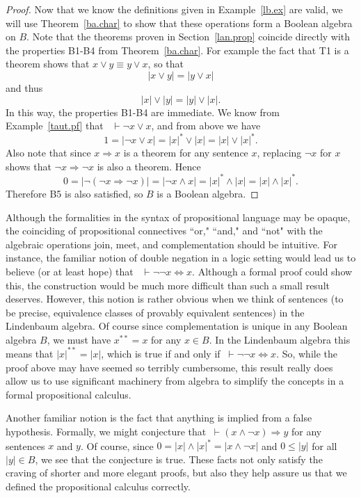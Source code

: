 \documentclass[11pt,titlepage]{article}
\newcommand{\imp}{\Rightarrow}
\newcommand{\ifff}{\Leftrightarrow}
\theoremstyle{definition}
\begin{document}
\begin{proof}
Now that we know the definitions given in Example~\ref{lb.ex} are valid, we will use Theorem~\ref{ba.char} to show that these operations form a Boolean algebra on $B$. Note that the theorems proven in Section~\ref{lan.prop} coincide directly with the properties B1-B4 from Theorem~\ref{ba.char}. For example the fact that T1 is a theorem shows that $x\lor y\equiv y\lor x$, so that $$|x\lor y| = |y\lor x|$$ and thus $$|x|\lor |y| = |y| \lor |x|.$$ In this way, the properties B1-B4 are immediate. We know from Example~\ref{taut.pf} that \ $\vdash \neg x \lor x$, and from above we have $$1=|\neg x \lor x| = |x|^*\lor |x| =|x|\lor |x|^*  .$$ Also note that since $x \imp x$ is a theorem for any sentence $x$, replacing $\neg x$ for $x$ shows that $ \neg x \imp \neg x$ is also a theorem. Hence $$0=|\neg(\neg  x\imp \neg x)|= |\neg x \land  x|  = | x|^* \land | x|=|x|\land| x|^* .$$ Therefore B5 is also satisfied, so $B$ is a Boolean algebra.\end{proof}

Although the formalities in the syntax of propositional language may be opaque, the coinciding of propositional connectives ``or," ``and," and ``not" with the algebraic operations join, meet, and complementation should be intuitive. For instance, the familiar notion of double negation in a logic setting would lead us to believe (or at least hope) that \ $\vdash \neg\neg x \ifff x$. Although a formal proof could show this, the construction would be much more difficult than such a small result deserves. However, this notion is rather obvious when we think of sentences (to be precise, equivalence classes of provably equivalent sentences) in the Lindenbaum algebra. Of course since complementation is unique in any Boolean algebra $B$, we must have $x^{**}=x$ for any $x\in B$. In the Lindenbaum algebra this means that $|x|^{**}=|x|$, which is true if and only if $\ \vdash \neg \neg x \ifff x$. So, while the proof above may have seemed so terribly cumbersome, this result really does allow us to use significant machinery from algebra to simplify the concepts in a formal propositional calculus.

Another familiar notion is the fact that anything is implied from a false hypothesis. Formally, we might conjecture that $ \ \vdash (x\land\neg x) \imp y$ for any sentences $x$ and $y$. Of course, since $0=|x|\land|x|^*= |x\land \neg x|$ and $0\leq |y|$ for all $|y| \in B$, we see that the conjecture is true. These facts not only satisfy the craving of shorter and more elegant proofs, but also they help assure us that we defined the propositional calculus correctly.
\end{document}
